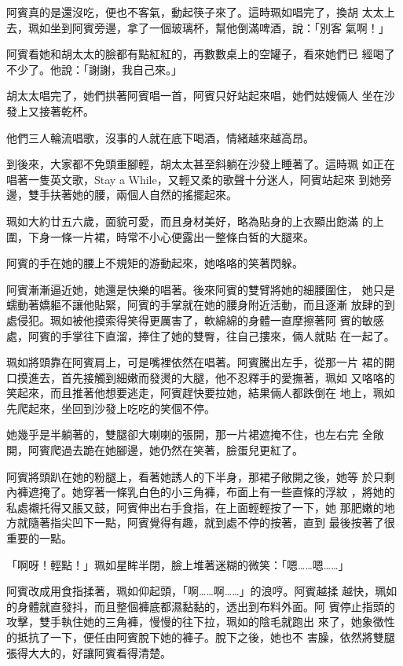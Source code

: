 阿賓真的是還沒吃，便也不客氣，動起筷子來了。這時珮如唱完了，換胡
太太上去，珮如坐到阿賓旁邊，拿了一個玻璃杯，幫他倒滿啤酒，說：「別客
氣啊！」

阿賓看她和胡太太的臉都有點紅紅的，再數數桌上的空罐子，看來她們已
經喝了不少了。他說：「謝謝，我自己來。」

胡太太唱完了，她們拱著阿賓唱一首，阿賓只好站起來唱，她們姑嫂倆人
坐在沙發上又接著乾杯。

他們三人輪流唱歌，沒事的人就在底下喝酒，情緒越來越高昂。

到後來，大家都不免頭重腳輕，胡太太甚至斜躺在沙發上睡著了。這時珮
如正在唱著一隻英文歌，Stay a While，又輕又柔的歌聲十分迷人，阿賓站起來
到她旁邊，雙手扶著她的腰，兩個人自然的搖擺起來。

珮如大約廿五六歲，面貌可愛，而且身材美好，略為貼身的上衣顯出飽滿
的上圍，下身一條一片裙，時常不小心便露出一整條白皙的大腿來。

阿賓的手在她的腰上不規矩的游動起來，她咯咯的笑著閃躲。

阿賓漸漸逼近她，她還是快樂的唱著。後來阿賓的雙臂將她的細腰圍住，
她只是蠕動著嬌軀不讓他貼緊，阿賓的手掌就在她的腰身附近活動，而且逐漸
放肆的到處侵犯。珮如被他摸索得笑得更厲害了，軟綿綿的身體一直摩擦著阿
賓的敏感處，阿賓的手掌往下直溜，捧住了她的雙臀，往自己摟來，倆人就貼
在一起了。

珮如將頭靠在阿賓肩上，可是嘴裡依然在唱著。阿賓騰出左手，從那一片
裙的開口摸進去，首先接觸到細嫩而發燙的大腿，他不忍釋手的愛撫著，珮如
又咯咯的笑起來，而且推著他想要逃走，阿賓趕快要拉她，結果倆人都跌倒在
地上，珮如先爬起來，坐回到沙發上吃吃的笑個不停。

她幾乎是半躺著的，雙腿卻大喇喇的張開，那一片裙遮掩不住，也左右完
全敞開，阿賓爬過去跪在她腳邊，她仍然在笑著，臉蛋兒更紅了。

阿賓將頭趴在她的粉腿上，看著她誘人的下半身，那裙子敞開之後，她等
於只剩內褲遮掩了。她穿著一條乳白色的小三角褲，布面上有一些直條的浮紋
，將她的私處襯托得又脹又鼓，阿賓伸出右手食指，在上面輕輕按了一下，她
那肥嫩的地方就隨著指尖凹下一點，阿賓覺得有趣，就到處不停的按著，直到
最後按著了很重要的一點。

「啊呀！輕點！」珮如星眸半閉，臉上堆著迷糊的微笑：「嗯……嗯……」

阿賓改成用食指揉著，珮如仰起頭，「啊……啊……」的浪哼。阿賓越揉
越快，珮如的身體就直發抖，而且整個褲底都濕黏黏的，透出到布料外面。阿
賓停止指頭的攻擊，雙手執住她的三角褲，慢慢的往下拉，珮如的陰毛就跑出
來了，她象徵性的抵抗了一下，便任由阿賓脫下她的褲子。脫下之後，她也不
害臊，依然將雙腿張得大大的，好讓阿賓看得清楚。

